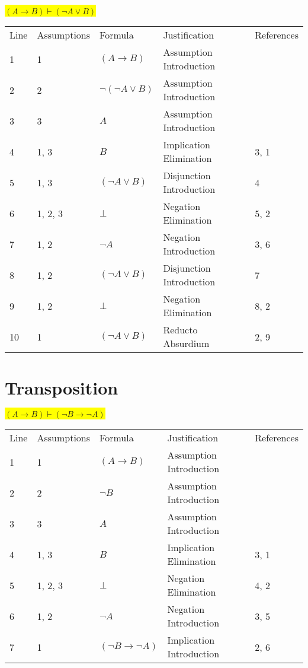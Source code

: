 \documentclass[12pt]{article}
\newcommand{\pr}[1]{\bigbreak \colorbox{Yellow}{$#1$} \smallbreak}
\begin{document}
\begin{flushleft}
\pr{(A \rightarrow B) \vdash (\neg A\lor B)}
\begin{tabular}{lllll}
    Line & Assumptions & Formula & Justification & References \\
    1 & 1 & $(A\rightarrow B)$  & Assumption Introduction &  \\
    2 & 2 & $\neg (\neg A\lor B)$  & Assumption Introduction &  \\
    3 & 3 & $A$  & Assumption Introduction &  \\
    4 & 1, 3 & $B$  & Implication Elimination & 3, 1 \\
    5 & 1, 3 & $(\neg A\lor B)$  & Disjunction Introduction & 4 \\
    6 & 1, 2, 3 & $\bot $  & Negation Elimination & 5, 2 \\
    7 & 1, 2 & $\neg A$  & Negation Introduction & 3, 6 \\
    8 & 1, 2 & $(\neg A\lor B)$  & Disjunction Introduction & 7 \\
    9 & 1, 2 & $\bot $  & Negation Elimination & 8, 2 \\
    10 & 1 & $(\neg A\lor B)$  & Reducto Absurdium & 2, 9 \\
\end{tabular}
 
\section{Transposition}
\pr{(A \rightarrow B) \vdash (\neg B \rightarrow \neg A)}
\begin{tabular}{lllll}
    Line & Assumptions & Formula & Justification & References \\
    1 & 1 & $(A\rightarrow B)$  & Assumption Introduction &  \\
    2 & 2 & $\neg B$  & Assumption Introduction &  \\
    3 & 3 & $A$  & Assumption Introduction &  \\
    4 & 1, 3 & $B$  & Implication Elimination & 3, 1 \\
    5 & 1, 2, 3 & $\bot $  & Negation Elimination & 4, 2 \\
    6 & 1, 2 & $\neg A$  & Negation Introduction & 3, 5 \\
    7 & 1 & $(\neg B\rightarrow \neg A)$  & Implication Introduction & 2, 6 \\
\end{tabular}


\end{flushleft}
\end{document}
